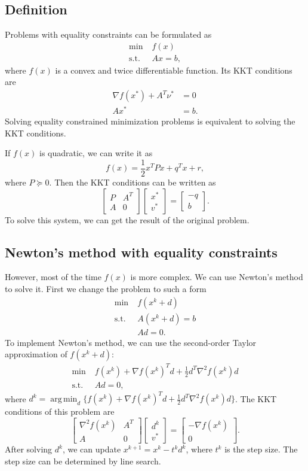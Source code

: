 \documentclass[lang=en,color=blue,mode=fancy,titlestyle=hang]{elegantbook}
\DeclareMathOperator*{\argmin}{arg\,min}
\begin{document}
\subsection{Definition}
Problems with equality constraints can be formulated as
\begin{align*}
\min \; &f(x)\\
\text{s.t.} \; &Ax = b,
\end{align*}
where $f(x)$ is a convex and twice differentiable function. Its KKT conditions are
\begin{align*}
\nabla f(x^*) + A^T \nu^* &= 0\\
Ax^* &= b.
\end{align*}
Solving equality constrained minimization problems is equivalent to solving the KKT conditions.

If $f(x)$ is quadratic, we can write it as
\[
f(x) = \frac12 x^T P x + q^T x + r,
\]
where $P \succeq 0$. Then the KKT conditions can be written as
\[
\begin{bmatrix}
  P & A^T \\
  A & 0
\end{bmatrix}
\begin{bmatrix}
  x^* \\ v^*
\end{bmatrix} =
\begin{bmatrix}
  -q \\ b
\end{bmatrix}.
\]
To solve this system, we can get the result of the original problem.

\subsection{Newton's method with equality constraints}
However, most of the time $f(x)$ is more complex. We can use Newton's method to solve it.
First we change the problem to such a form
\begin{align*}
\min \; &f(x^k + d)\\
\text{s.t.} \; &A(x^k + d) = b\\
&Ad = 0.
\end{align*}
To implement Newton's method, we can use the second-order Taylor approximation of $f(x^k + d)$:
\begin{align*}
\min \; &f(x^k) + \nabla f(x^k)^T d + \frac12 d^T \nabla^2 f(x^k) d\\
\text{s.t.} \; &Ad = 0,
\end{align*}
where $d^k = \argmin_d \{f(x^k) + \nabla f(x^k)^T d + \frac12 d^T \nabla^2 f(x^k) d\}$.
The KKT conditions of this problem are
\[
\begin{bmatrix}
  \nabla^2 f(x^k) & A^T \\
  A & 0
\end{bmatrix}
\begin{bmatrix}
  d^k \\ v^*
\end{bmatrix} =
\begin{bmatrix}
  -\nabla f(x^k) \\ 0
\end{bmatrix}.
\]
After solving $d^k$, we can update $x^{k+1} = x^k - t^k d^k$, where $t^k$ is the step size.
The step size can be determined by line search.
\end{document}
